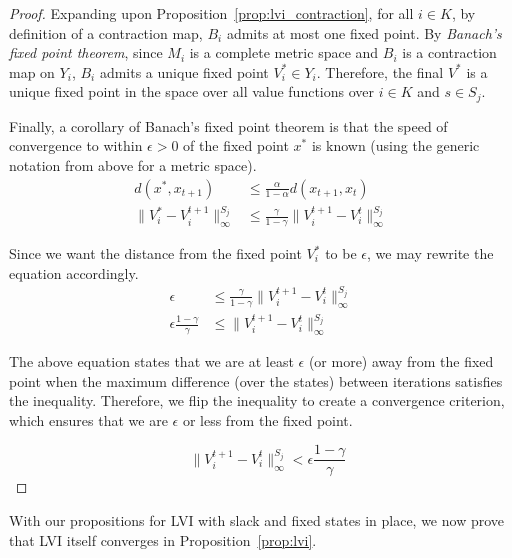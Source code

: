 \begin{proof}
Expanding upon Proposition~\ref{prop:lvi_contraction}, for all $i \in K$, by definition of a contraction map, $B_i$ admits at most one fixed point. By \emph{Banach's fixed point theorem}, since $M_i$ is a complete metric space and $B_i$ is a contraction map on $Y_i$, $B_i$ admits a unique fixed point $V_i^* \in Y_i$. Therefore, the final $V^*$ is a unique fixed point in the space over all value functions over $i \in K$ and $s \in S_j$.

Finally, a corollary of Banach's fixed point theorem is that the speed of convergence to within $\epsilon > 0$ of the fixed point $x^*$ is known (using the generic notation from above for a metric space).
\begin{align*}
    d(x^*, x_{t+1}) &\leq \frac{\alpha}{1 - \alpha} d(x_{t+1}, x_t) \\
    \| V_i^* - V_i^{t+1}\|_\infty^{S_j} &\leq \frac{\gamma}{1 - \gamma} \| V_i^{t+1} - V_i^t \|_\infty^{S_j}
\end{align*}

Since we want the distance from the fixed point $V_i^*$ to be $\epsilon$, we may rewrite the equation accordingly.
\begin{align*}
    \epsilon &\leq \frac{\gamma}{1 - \gamma} \| V_i^{t+1} - V_i^t \|_\infty^{S_j} \\
    \epsilon \frac{1 - \gamma}{\gamma} &\leq \| V_i^{t+1} - V_i^t \|_\infty^{S_j}
\end{align*}

The above equation states that we are at least $\epsilon$ (or more) away from the fixed point when the maximum difference (over the states) between iterations satisfies the inequality. Therefore, we flip the inequality to create a convergence criterion, which ensures that we are $\epsilon$ or less from the fixed point.

\begin{equation*}
    \quad \| V_i^{t+1} - V_i^t \|_\infty^{S_j} < \epsilon \frac{1 - \gamma}{\gamma}
\end{equation*}
\end{proof}


With our propositions for LVI with slack and fixed states in place, we now prove that LVI itself converges in Proposition~\ref{prop:lvi}.

